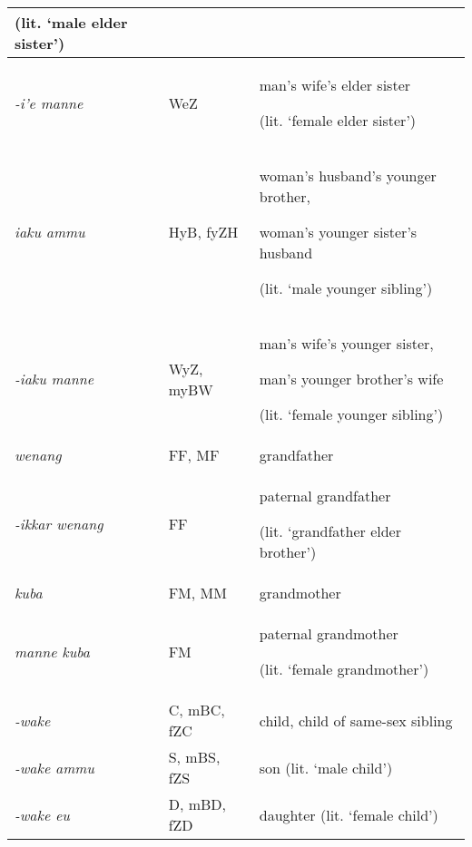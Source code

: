 \begin{center}
\begin{supertabular}{|m{1.0288599in}|m{2.32126in}|m{2.55386in}|}
(lit. {\textquoteleft}male elder sister{\textquoteright})\\\hline
\textit{{}-i{\textquoteright}e manne} &
WeZ &
man{\textquoteright}s wife{\textquoteright}s elder sister

(lit. {\textquoteleft}female elder sister{\textquoteright})\\\hline
\textit{iaku ammu} &
HyB, fyZH &
woman{\textquoteright}s husband{\textquoteright}s younger brother,

woman{\textquoteright}s younger sister{\textquoteright}s husband

(lit. {\textquoteleft}male younger sibling{\textquoteright})\\\hline
\textit{{}-iaku manne} &
WyZ, myBW &
man{\textquoteright}s wife{\textquoteright}s younger sister,

man{\textquoteright}s younger brother{\textquoteright}s wife

(lit. {\textquoteleft}female younger sibling{\textquoteright})\\\hline
\textit{wenang} &
FF, MF &
grandfather\\\hline
\textit{{}-ikkar wenang} &
FF &
paternal grandfather

(lit. {\textquoteleft}grandfather elder brother{\textquoteright})\\\hline
\textit{kuba} &
FM, MM &
grandmother\\\hline
\textit{manne kuba} &
FM &
paternal grandmother

(lit. {\textquoteleft}female grandmother{\textquoteright})\\\hline
\textit{{}-wake} &
C, mBC, fZC &
child, child of same-sex sibling\\\hline
\textit{{}-wake ammu} &
S, mBS, fZS &
son (lit. {\textquoteleft}male child{\textquoteright})\\\hline
\textit{{}-wake eu} &
D, mBD, fZD &
daughter (lit. {\textquoteleft}female child{\textquoteright})\\\hline
\end{supertabular}
\end{center}
